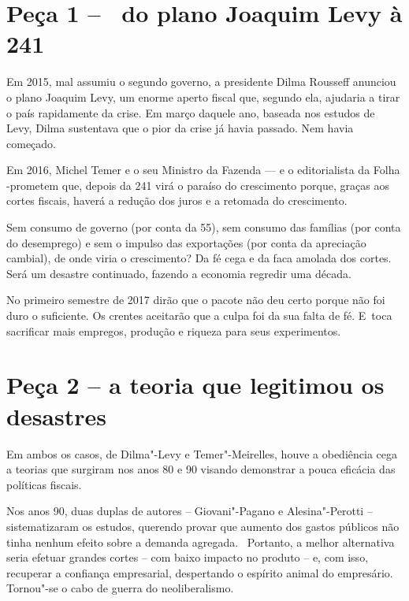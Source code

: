  

\section{Peça 1 -- ~do plano Joaquim Levy à  241}

Em 2015, mal assumiu o segundo governo, a presidente Dilma Rousseff
anunciou o plano Joaquim Levy, um enorme aperto fiscal que, segundo ela,
ajudaria a tirar o país rapidamente da crise. Em março daquele ano,
baseada nos estudos de Levy, Dilma sustentava que o pior da crise já
havia passado. Nem havia começado.

Em 2016, Michel Temer e o seu Ministro da Fazenda --- e o editorialista
da Folha -prometem que, depois da  241 virá o paraíso do crescimento
porque, graças aos cortes fiscais, haverá a redução dos juros e a
retomada do crescimento.

Sem consumo de governo (por conta da  55), sem consumo das famílias
(por conta do desemprego) e sem o impulso das exportações (por conta da
apreciação cambial), de onde viria o crescimento? Da fé cega e da faca
amolada dos cortes. Será um desastre continuado, fazendo a economia
regredir uma década.

No primeiro semestre de 2017 dirão que o pacote não deu certo porque não
foi duro o suficiente. Os crentes aceitarão que a culpa foi da sua falta
de fé. E~toca sacrificar mais empregos, produção e riqueza para seus
experimentos.

\section{Peça 2 -- a teoria que legitimou os desastres}

Em ambos os casos, de Dilma"-Levy e Temer"-Meirelles, houve a obediência
cega a teorias que surgiram nos anos 80 e 90 visando demonstrar a pouca
eficácia das políticas fiscais.

Nos anos 90, duas duplas de autores -- Giovani"-Pagano e Alesina"-Perotti
-- sistematizaram os estudos, querendo provar que aumento dos gastos
públicos não tinha nenhum efeito sobre a demanda agregada. ~Portanto, a
melhor alternativa seria efetuar grandes cortes -- com baixo impacto no
produto -- e, com isso, recuperar a confiança empresarial, despertando o
espírito animal do empresário. Tornou"-se o cabo de guerra do
neoliberalismo.

